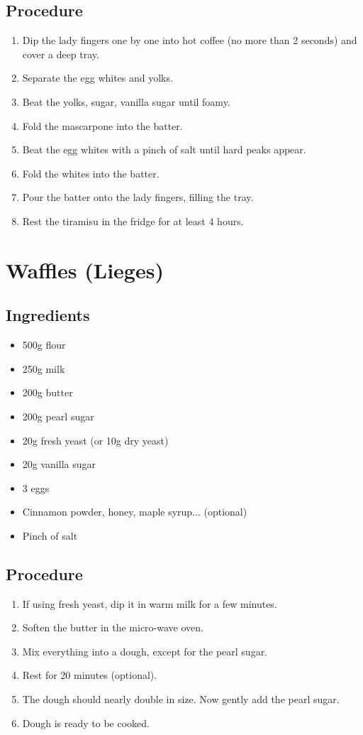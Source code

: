 \documentclass[10pt]{book}
\begin{document}
\subsection*{Procedure}
	\begin{enumerate}
		\item Dip the lady fingers one by one into hot coffee (no more than 2 seconds) and cover a deep tray.
		\item Separate the egg whites and yolks.
		\item Beat the yolks, sugar, vanilla sugar until foamy.
		\item Fold the mascarpone into the batter.
		\item Beat the egg whites with a pinch of salt until hard peaks appear.
		\item Fold the whites into the batter.
		\item Pour the batter onto the lady fingers, filling the tray.
		\item Rest the tiramisu in the fridge for at least 4 hours.
	\end{enumerate}
\newpage


\newpage
\section*{Waffles (Lieges)}
\subsection*{Ingredients}
	\begin{itemize}
		\item 500g flour
		\item 250g milk
		\item 200g butter
		\item 200g pearl sugar
		\item 20g fresh yeast (or 10g dry yeast)
		\item 20g vanilla sugar
		\item 3 eggs
		\item Cinnamon powder, honey, maple syrup... (optional)
		\item Pinch of salt
	\end{itemize}
\subsection*{Procedure}
	\begin{enumerate}
		\item If using fresh yeast, dip it in warm milk for a few minutes.
		\item Soften the butter in the micro-wave oven.
		\item Mix everything into a dough, except for the pearl sugar.
		\item Rest for 20 minutes (optional).
		\item The dough should nearly double in size. Now gently add the pearl sugar.
		\item Dough is ready to be cooked.
	\end{enumerate}
\newpage
\end{document}
